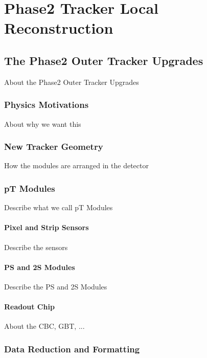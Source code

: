 \chapter{Phase2 Tracker Local Reconstruction}
\label{chap:phase2_tracker}

    \section{The Phase2 Outer Tracker Upgrades}

        About the Phase2 Outer Tracker Upgrades

        \subsection{Physics Motivations}

            About why we want this

        \subsection{New Tracker Geometry}

            How the modules are arranged in the detector

        \subsection{pT Modules}

            Describe what we call pT Modules

            \subsubsection{Pixel and Strip Sensors}

                Describe the sensors

            \subsubsection{PS and 2S Modules}

                Describe the PS and 2S Modules

            \subsubsection{Readout Chip}

                About the CBC, GBT, ...

        \subsection{Data Reduction and Formatting}

